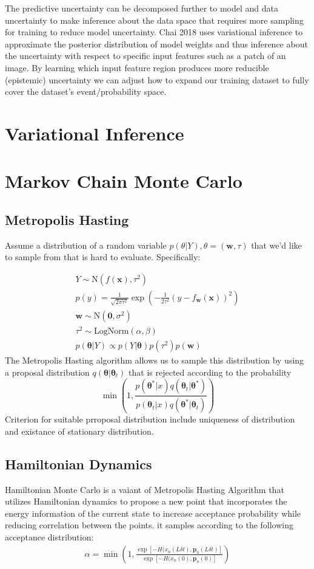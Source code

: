 \documentclass[honours,12pt]{unswthesis}
\numberwithin{equation}{section}
\begin{document}
The predictive uncertainty can be decomposed further to model and data uncertainty to make inference about the data space that requires more sampling for training to reduce model uncertainty. Chai 2018 \cite{Chai2018uncertainBNN} uses variational inference to approximate the posterior distribution of model weights and thus inference about the uncertainty with respect to specific input features such as a patch of an image. By learning which input feature region produces more reducible (epistemic) uncertainty we can adjust how to expand our training dataset to fully cover the dataset's event/probability space. 

\section{Variational Inference}
\section{Markov Chain Monte Carlo}
\subsection {Metropolis Hasting}
Assume a distribution of a random variable $p(\theta|Y), \theta = (\bm{w},\tau)$ that we'd like to sample from that is hard to evaluate. Specifically:

\begin{gather*} 
    Y \sim \text{N}(f(\bm{x}),\tau^2) \\
    p(y)=\frac{1}{\sqrt{2\pi\tau^2}} \exp(-\frac{1}{2\tau^2} (y-f_{\bm{w}}(\bm{x}))^2) \\ 
    \bm{w} \sim \text{N}(\mathbf{0},\sigma^2) \\ 
    \tau^2 \sim \text{LogNorm}(\alpha,\beta) \\
    p(\bm{\theta}|Y) \propto p(Y|\bm{\theta})p(\tau^2)p(\bm{w})
\end{gather*}
The Metropolis Hasting algorithm allows us to sample this distribution by using a proposal distribution $q(\bm{\theta}|\bm{\theta}_t)$ that is rejected according to the probability 
\begin{equation*}
    \min(1,\frac{p(\bm{\theta}^*|x)q(\bm{\theta}_t|\bm{\theta}^*)}{p(\bm{\theta}_t|x)q(\bm{\theta}^*|\bm{\theta}_t)})
\end{equation*}
Criterion for suitable prroposal distribution include uniqueness of distribution and existance of stationary distribution. 

\subsection{Hamiltonian Dynamics}
Hamiltonian Monte Carlo is a vaiant of Metropolis Hasting Algorithm that utilizes Hamiltonian dynamics to propose a new point that incorporates the energy information of the current state to increase acceptance probability while reducing correlation between the points.
it samples according to the following acceptance distribution:
\begin{gather*}
    \alpha = \min(1,\frac{\exp[-H(x_n (L\delta t),\mathbf{p}_n(L\delta t) ]} {\exp[-H(x_n (0),\mathbf{p}_n(0) ]} )
\end{gather*} 
\end{document}
